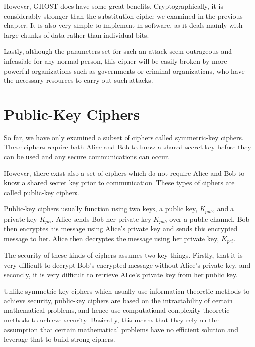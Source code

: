 \documentclass[12pt, a4paper, draft]{report}
\begin{document}
However, GHOST does have some great benefits. Cryptographically, it is considerably
stronger than the substitution cipher we examined in the previous chapter. It is also
very simple to implement in software, as it deals mainly with large chunks of data rather
than individual bits.

Lastly, although the parameters set for such an attack seem outrageous and infeasible
for any normal person, this cipher will be easily broken by more powerful organizations
such as governments or criminal organizations, who have the necessary resources to carry
out such attacks.



\section{Public-Key Ciphers}

So far, we have only examined a subset of ciphers called symmetric-key
ciphers. These ciphers require both Alice and Bob to know a shared secret key
before they can be used and any secure communications can occur.

However, there exist also a set of ciphers which do not require Alice and Bob
to know a shared secret key prior to communication. These types of ciphers
are called public-key ciphers.

Public-key ciphers usually function using two keys, a public key, $K_{pub}$,
and a private key $K_{pri}$. Alice sends Bob her private key $K_{pub}$ over
a public channel. Bob then encryptes his message using Alice's private key
and sends this encrypted message to her. Alice then decryptes the message
using her private key, $K_{pri}$.

The security of these kinds of ciphers assumes two key things. Firstly, that
it is very difficult to decrypt Bob's encrypted message without Alice's
private key, and secondly, it is very difficult to retrieve Alice's private
key from her public key.

Unlike symmetric-key ciphers which usually use information theoretic methods
to achieve security, public-key ciphers are based on the intractability of
certain mathematical problems, and hence use computational complexity theoretic
methods to achieve security. Basically, this means that they rely on the
assumption that certain mathematical problems have no efficient solution
and leverage that to build strong ciphers.
\end{document}
